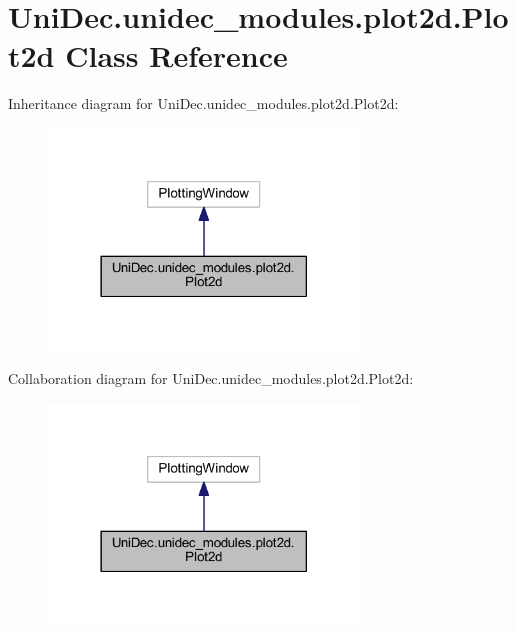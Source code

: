 \hypertarget{class_uni_dec_1_1unidec__modules_1_1plot2d_1_1_plot2d}{}\section{Uni\+Dec.\+unidec\+\_\+modules.\+plot2d.\+Plot2d Class Reference}
\label{class_uni_dec_1_1unidec__modules_1_1plot2d_1_1_plot2d}


Inheritance diagram for Uni\+Dec.\+unidec\+\_\+modules.\+plot2d.\+Plot2d\+:\nopagebreak
\begin{figure}[H]
\begin{center}
\leavevmode
\includegraphics[width=234pt]{class_uni_dec_1_1unidec__modules_1_1plot2d_1_1_plot2d__inherit__graph}
\end{center}
\end{figure}


Collaboration diagram for Uni\+Dec.\+unidec\+\_\+modules.\+plot2d.\+Plot2d\+:\nopagebreak
\begin{figure}[H]
\begin{center}
\leavevmode
\includegraphics[width=234pt]{class_uni_dec_1_1unidec__modules_1_1plot2d_1_1_plot2d__coll__graph}
\end{center}
\end{figure}
